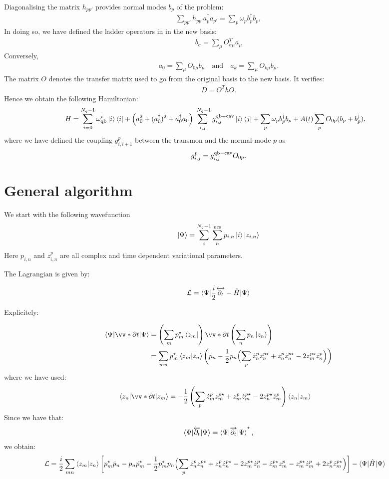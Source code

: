 \documentclass[prb]{revtex4}
\newcommand{\eq}[1]{\begin{align}#1\end{align}}
\newcommand{\Le}{\left}
\newcommand{\Ri}{\right}
\newcommand{\nn}{\nonumber}
\newcommand{\f}{\frac}
\newcommand{\mc}{\mathcal}
\newcommand{\ra}{\rangle}
\newcommand{\la}{\langle}
\begin{document}
Diagonalising the matrix $h_{pp'}$ provides normal modes $b_p$ of the problem:
\eq{
\sum_{pp'} h_{pp'} a_p^\dag a_{p'} = \sum_p \omega_p b_p^\dag b_p,
}
In doing so, we have defined the ladder operators in in the new basis:
\eq{
b_\sigma = \sum_\mu O^T_{\sigma \mu} a_\mu
}
Conversely,
\eq{
a_0 = \sum_\mu O_{0\mu} b_\mu \quad \text{and} \quad a_k = \sum_\mu O_{k \mu} b_\mu.
}
The matrix $O$ denotes the transfer matrix used to go from the original basis to the new basis. It verifies:
\eq{
D = O^T h O.
}
Hence we obtain the following Hamiltonian:
\eq{
H & = \sum_{i=0}^{ N_q-1} \omega_{\rm qb }^i \ket{i} \bra{i}  + \Big( a_0^2+(a_0^\dag)^2 +  a_0^\dag a_0 \Big)  \sum_{i,j}^{\ N_q-1} g^{\rm qb-cav}_{i,j}\ket{i}\bra{j} + \sum_{p}\omega_p b_p^\dag b_p +  A(t) \sum_p O_{0p}(b_p+b_p^\dag),
}
where we have defined the coupling $g_{i,i+1}^p$ between the transmon and the normal-mode $p$  as 
\eq{
g_{i,j}^p = g^{\rm qb-cav}_{i,j} O_{0p}.
}

\section{General algorithm}


%
We start with the following wavefunction
\eq{
|\Psi\ra = \sum_{i}^{N_q-1} \sum_{n}^{\rm ncs} p_{i,n} \ket{i} \ket{z_{i,n}}
}
Here $p_{i,n}$ and $z_{i,n}^p$ are all complex and time dependent variational parameters. 

The Lagrangian is given by:

\eq{
\mc{L}  = \braket{ \Psi | \frac{i}{2}  \overleftrightarrow{\partial_t} - \hat H | \Psi  }
}

Explicitely:

\eq{
\braket{\Psi|  \vv*{\partial}{t} | \Psi } 
&=  \left(\sum_{m} p_m^\star  \bra{z_m} \right) \vv*{\partial}{t} \left(\sum_{n} p_n \ket{z_n} \right)  \notag \\
&= \sum_{mn} p_m^\star  \braket{z_m|z_n} \biggl( \dot{p}_n -\frac{1}{2}p_n \Bigl( \sum_p \dot{z}_n^p z_n^{p\star} + z_n^p \dot{z}_n^{p\star} - 2 z_m^{p\star} \dot{z}_n^p \Bigr)  \biggr)
}
where we have used: 
\eq{
\la z_n | \vv*{\partial}{t} | z_m \ra &= -\f{1}{2} \Le( \sum_p  \dot{z}_m^p z_m^{p\star} +
z_m^p \dot{z}_m^{p\star} -2 z_n^{p\star}\dot{z}_m^p \Ri) \la z_n | z_m \ra \nn 
}
Since we have that:
\eq{
\braket{\Psi|   \overleftarrow{\partial_t} | \Psi }  =  \braket{\Psi| \overrightarrow{\partial_t} | \Psi } ^\star,
}
we obtain:
\eq{
\mc{L}  &= \frac{i}{2}\sum_{mn}  \braket{z_m|z_n} \biggl[ p_m^\star \dot{p}_n - p_n \dot{p}_m^\star - \frac{1}{2}p_m^\star p_n \Bigl( \sum_p \dot{z}_n^p z_n^{p\star} + z_n^p \dot{z}_n^{p\star} - 2 z_m^{p\star} \dot{z}_n^p - \dot{z}_m^{p\star} z_m ^p- z_m^{p\star} \dot{z}_m^p + 2 z_n^p \dot{z}_m^{p\star} \Bigr)  \biggr] -  \braket{ \Psi |  \hat H | \Psi  }
}
\end{document}

